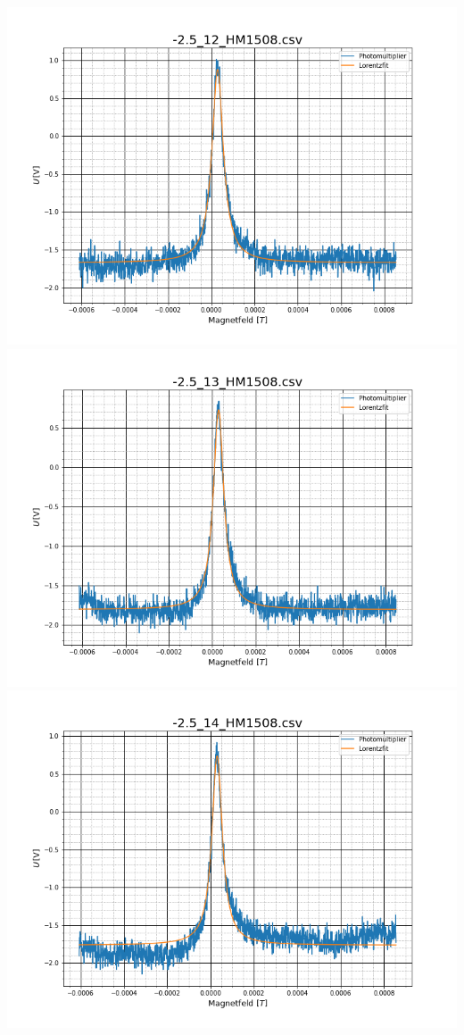 \begin{center}
\includegraphics[scale=0.3]{Bild/Anhang/Statistik/stat13}	\includegraphics[scale=0.3]{Bild/Anhang/Statistik/stat14}\\

\includegraphics[scale=0.3]{Bild/Anhang/Statistik/stat15}
\end{center}

